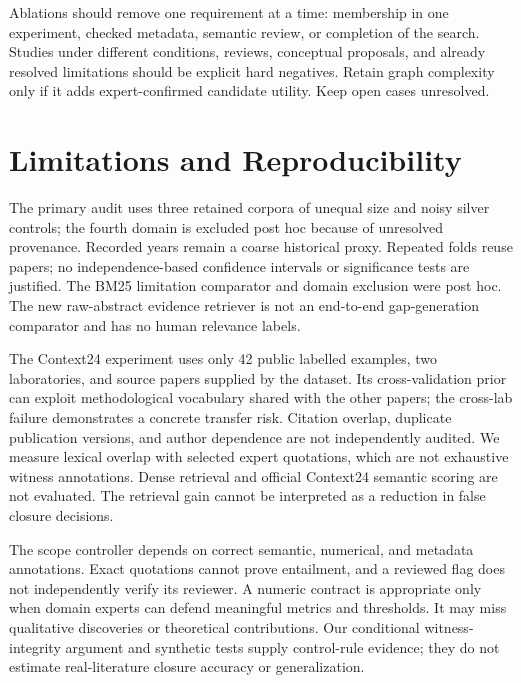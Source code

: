 \documentclass[runningheads]{llncs}
\begin{document}
Ablations should remove one requirement at a time: membership in one experiment, checked metadata, semantic review, or completion of the search. Studies under different conditions, reviews, conceptual proposals, and already resolved limitations should be explicit hard negatives. Retain graph complexity only if it adds expert-confirmed candidate utility. Keep open cases unresolved.

\section{Limitations and Reproducibility}
The primary audit uses three retained corpora of unequal size and noisy silver controls; the fourth domain is excluded post hoc because of unresolved provenance. Recorded years remain a coarse historical proxy. Repeated folds reuse papers; no independence-based confidence intervals or significance tests are justified. The BM25 limitation comparator and domain exclusion were post hoc. The new raw-abstract evidence retriever is not an end-to-end gap-generation comparator and has no human relevance labels.

The Context24 experiment uses only 42 public labelled examples, two laboratories, and source papers supplied by the dataset. Its cross-validation prior can exploit methodological vocabulary shared with the other papers; the cross-lab failure demonstrates a concrete transfer risk. Citation overlap, duplicate publication versions, and author dependence are not independently audited. We measure lexical overlap with selected expert quotations, which are not exhaustive witness annotations. Dense retrieval and official Context24 semantic scoring are not evaluated. The retrieval gain cannot be interpreted as a reduction in false closure decisions.

The scope controller depends on correct semantic, numerical, and metadata annotations. Exact quotations cannot prove entailment, and a reviewed flag does not independently verify its reviewer. A numeric contract is appropriate only when domain experts can defend meaningful metrics and thresholds. It may miss qualitative discoveries or theoretical contributions. Our conditional witness-integrity argument and synthetic tests supply control-rule evidence; they do not estimate real-literature closure accuracy or generalization.
\end{document}
